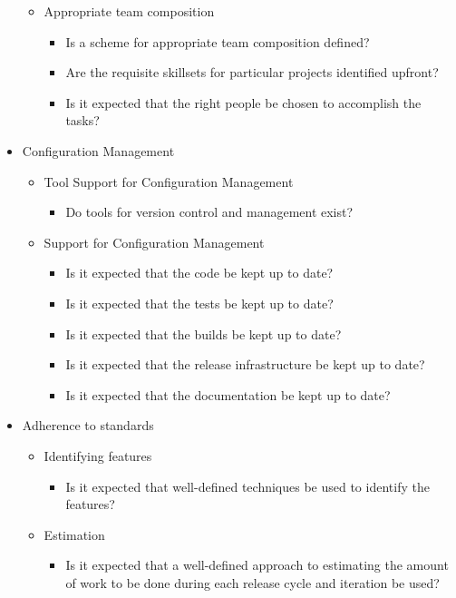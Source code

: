 \begin{appendices}
\begin{itemize}
\begin{itemize}
			\item Appropriate team composition
				\begin{itemize}
					\item Is a scheme for appropriate team composition defined?
					\item Are the requisite skillsets for particular projects identified upfront?
					\item Is it expected that the right people be chosen to accomplish the tasks?
				\end{itemize}
		\end{itemize}
	\item Configuration Management
		\begin{itemize}
			\item Tool Support for Configuration Management
				\begin{itemize}
					\item Do tools for version control and management exist?
				\end{itemize}
			\item Support for Configuration Management
				\begin{itemize}
					\item Is it expected that the code be kept up to date?
					\item Is it expected that the tests be kept up to date?
					\item Is it expected that the builds be kept up to date?
					\item Is it expected that the release infrastructure be kept up to date?
					\item Is it expected that the documentation be kept up to date?
				\end{itemize}
		\end{itemize}
	\item Adherence to standards
		\begin{itemize}
			\item Identifying features
				\begin{itemize}
					\item Is it expected that well-defined techniques be used to identify the features?
					\end{itemize}
			\item Estimation
				\begin{itemize}
					\item Is it expected that a well-defined approach to estimating the amount of work to be done during each release cycle and iteration be used?

\end{itemize}
\end{itemize}
\end{itemize}
\end{appendices}
